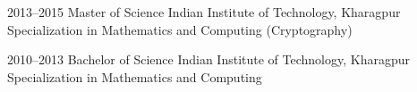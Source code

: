 \documentclass[print]{friggeri-cv} %
\begin{document}
\begin{entrylist}


\entry
{2013--2015}
{Master {\normalfont of Science}}
{Indian Institute of Technology, Kharagpur}
{Specialization in Mathematics and Computing (Cryptography)}


\entry
{2010--2013}
{Bachelor {\normalfont of Science}}
{Indian Institute of Technology, Kharagpur}
{Specialization in Mathematics and Computing}


\end{entrylist}
\end{document}
